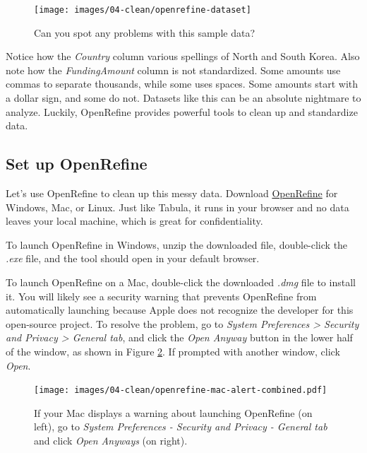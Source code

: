 \documentclass[
  english,
]{book}
\begin{document}
\begin{figure}
\texttt{[image: images/04-clean/openrefine-dataset]} \caption{Can you spot any problems with this sample data?}\label{fig:openrefine-dataset}
\end{figure}

Notice how the \emph{Country} column various spellings of North and South Korea. Also note how the \emph{FundingAmount} column is not standardized. Some amounts use commas to separate thousands, while some uses spaces. Some amounts start with a dollar sign, and some do not. Datasets like this can be an absolute nightmare to analyze. Luckily, OpenRefine provides powerful tools to clean up and standardize data.

\hypertarget{set-up-openrefine}{%
\subsection*{Set up OpenRefine}\label{set-up-openrefine}}

Let's use OpenRefine to clean up this messy data. Download \href{https://openrefine.org/download.html}{OpenRefine} for Windows, Mac, or Linux. Just like Tabula, it runs in your browser and no
data leaves your local machine, which is great for confidentiality.

To launch OpenRefine in Windows, unzip the downloaded file, double-click the \emph{.exe} file, and the tool should open in your default browser.

To launch OpenRefine on a Mac, double-click the downloaded \emph{.dmg} file to install it. You will likely see a security warning that prevents OpenRefine from automatically launching because Apple does not recognize the developer for this open-source project. To resolve the problem, go to \emph{System Preferences \textgreater{} Security and Privacy \textgreater{} General tab}, and click the \emph{Open Anyway} button in the lower half of the window, as shown in Figure \ref{fig:openrefine-mac-alert-combined}. If prompted with another window, click \emph{Open}.



\begin{figure}
\centering
\texttt{[image: images/04-clean/openrefine-mac-alert-combined.pdf]}
\caption{\label{fig:openrefine-mac-alert-combined}If your Mac displays a warning about launching OpenRefine (on left), go to \emph{System Preferences - Security and Privacy - General tab} and click \emph{Open Anyways} (on right).}
\end{figure}
\end{document}

